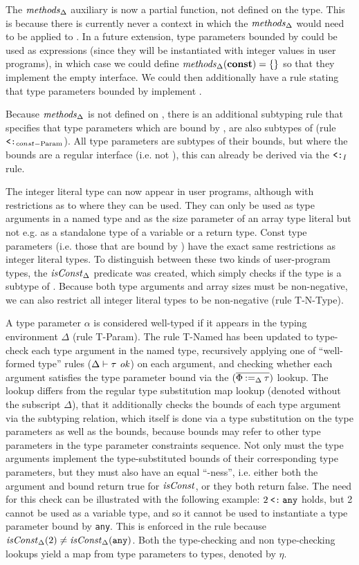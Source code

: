 The $\mathit{methods}_\Delta$ auxiliary is now a partial function, not defined on the
 type. This is because there is currently never a context in which the
$\mathit{methods}_\Delta$ would need to be applied to . In a future extension,
type parameters bounded by  could be used as expressions (since they will
be instantiated with integer values in user programs), in which case we could
define $\mathit{methods}_\Delta(\texttt{\bf const}) = \{\}$ so that they implement the empty
interface. We could then additionally have a rule stating that type parameters
bounded by  implement .

Because $\mathit{methods}_\Delta$ is not defined on , there is an additional
subtyping rule that specifies that type parameters which are bound by
, are also subtypes of  (rule $\mathbin{\texttt{<:}}_{const-\text{Param}}$).
All type parameters are subtypes of their bounds, but where the bounds are a
regular interface (i.e. not ), this can already be derived via the
$\mathbin{\texttt{<:}}_I$ rule.

The integer literal type can now appear in user programs, although with
restrictions as to where they can be used. They can only be used as type
arguments in a named type and as the size parameter of an array type literal but
not e.g. as a standalone type of a variable or a return type. Const type
parameters (i.e. those that are bound by ) have the exact same
restrictions as integer literal types. To distinguish between these two kinds of
user-program types, the $\mathit{isConst}_\Delta$ predicate was created, which simply
checks if the type is a subtype of . Because both  type
arguments and array sizes must be non-negative, we can also restrict all integer
literal types to be non-negative (rule T-N-Type).

A type parameter $\alpha$ is considered well-typed if it appears in the typing
environment $\Delta$ (rule T-Param). The rule T-Named has been updated to
type-check each type argument in the named type, recursively applying one of
``well-formed type'' rules ($\Delta \vdash \tau ~\mathit{ok}$) on each argument, and
checking whether each argument satisfies the type parameter bound via the
$(\overline{\Phi \mathbin{:=}_\Delta \tau})$ lookup. The lookup differs from the regular type
substitution map lookup (denoted without the subscript $\Delta$), that it
additionally checks the bounds of each type argument via the subtyping relation,
which itself is done via a type substitution on the type parameters as well as
the bounds, because bounds may refer to other type parameters in the type
parameter constraints sequence. Not only must the type arguments implement the
type-substituted bounds of their corresponding type parameters, but they must
also have an equal ``-ness'', i.e. either both the argument and bound
return true for $\mathit{isConst}$, or they both return false. The need for this check
can be illustrated with the following example: $2 \mathbin{\texttt{<:}} \texttt{any}$ holds, but
2 cannot be used as a variable type, and so it cannot be used to instantiate a
type parameter bound by \texttt{any}. This is enforced in the rule because
$\mathit{isConst}_\Delta(2) \neq \mathit{isConst}_\Delta(\texttt{any})$. Both the type-checking
and non type-checking lookups yield a map from type parameters to types, denoted
by $\eta$.

